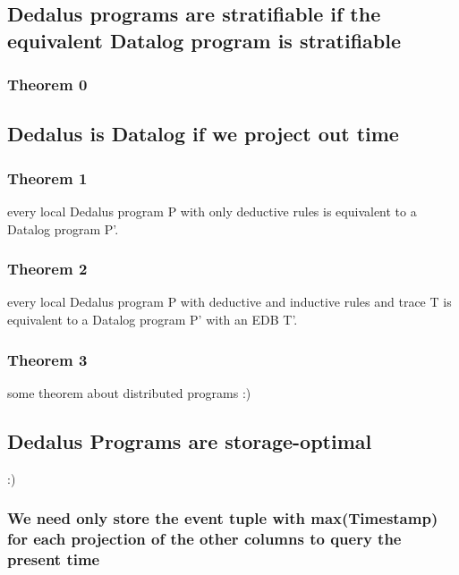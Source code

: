 \documentclass{acm_proc_article-sp-sigmod09}
\begin{document}
\subsection{Dedalus programs are stratifiable if the equivalent Datalog program is stratifiable}

\subsubsection{Theorem 0}

\subsection{Dedalus is Datalog if we project out time}

\subsubsection{Theorem 1}

\newtheorem{foo}{bar bas bat}
every local Dedalus program P with only deductive rules is equivalent to a Datalog program P'.

\subsubsection{Theorem 2}

every local Dedalus program P with deductive and inductive rules and trace T is equivalent to a Datalog program P' with an EDB T'.

\subsubsection{Theorem 3}

some theorem about distributed programs :)

\subsection{Dedalus Programs are storage-optimal}

:)

\subsubsection{We need only store the event tuple with max(Timestamp) for each projection of the other columns to query the present time}
\end{document}
